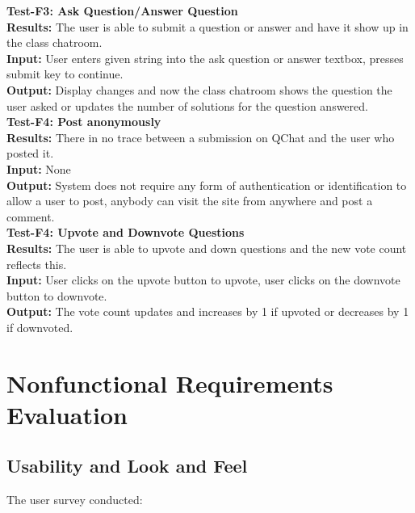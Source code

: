 \documentclass[12pt, titlepage]{article}
\begin{document}
\noindent\textbf{Test-F3: Ask Question/Answer Question} \\
\textbf{Results:} The user is able to submit a question or answer and have it show up in the class chatroom. \\
\textbf{Input:} User enters given string into the ask question or answer textbox, presses submit key to continue. \\
\textbf{Output:} Display changes and now the class chatroom shows the question the user asked or  updates the number of solutions for the question answered. \\

\noindent\textbf{Test-F4: Post anonymously} \\
\textbf{Results:} There in no trace between a submission on QChat and the user who posted it. \\
\textbf{Input:} None \\
\textbf{Output:} System does not require any form of authentication or identification to allow a user to post, anybody can visit the site from anywhere and post a comment. \\

\noindent\textbf{Test-F4: Upvote and Downvote Questions} \\
\textbf{Results:} The user is able to upvote and down questions and the new vote count reflects this.  \\
\textbf{Input:} User clicks on the upvote button to upvote, user clicks on the downvote button to downvote. \\
\textbf{Output:} The vote count updates and increases by 1 if upvoted or decreases by 1 if downvoted. \\



\section{Nonfunctional Requirements Evaluation}


\subsection{Usability and Look and Feel}
The user survey conducted: 
\end{document}
